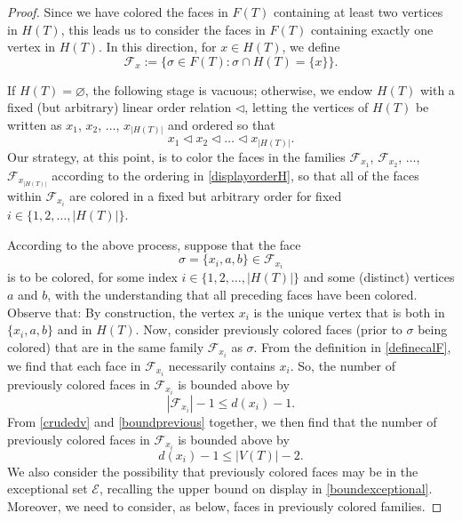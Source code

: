 \documentclass[12pt]{article}
\begin{document}
\begin{proof}
 Since we have colored the faces in $F(T)$ containing at least two vertices in $H(T)$, 
 this leads us to consider the faces in $F(T)$ containing exactly one vertex in $H(T)$.
 In this direction, for $x \in H(T)$, we define
\begin{equation}\label{definecalF}
 \mathcal{F}_{x} := \{ \sigma \in F(T) : \sigma \cap H(T) = \{ x \} \}. 
\end{equation}
 
 If $H(T) = \varnothing$, the following stage is vacuous; otherwise, we endow $H(T)$ with a fixed (but arbitrary) linear order relation 
 $\triangleleft$, letting the vertices of $H(T)$ be written as $x_{1}$, $x_{2}$, $\ldots$, $x_{|H(T)|}$
 and ordered so that 
\begin{equation}\label{displayorderH} 
 x_{1} \triangleleft x_{2} \triangleleft \ldots \triangleleft x_{|H(T)|}.
\end{equation}
 Our strategy, at this point, is to 
 color the faces in the families 
 $\mathcal{F}_{x_{1}}$, $\mathcal{F}_{x_{2}}$, $\ldots$, $\mathcal{F}_{x_{|H(T)|}}$
 according to the ordering in \eqref{displayorderH}, 
 so that all of the faces within $\mathcal{F}_{x_{i}}$ are colored in a fixed but arbitrary order
 for fixed $i \in \{ 1, 2, \ldots, |H(T)| \}$. 

 According to the above process, suppose that 
 the face 
\begin{equation}\label{definesigma} 
 \sigma = \{ x_{i}, a, b \} \in \mathcal{F}_{x_{i}}
\end{equation}
 is to be colored, for some index 
 $i \in \{ 1, 2, \ldots, |H(T)| \}$ 
 and some (distinct) vertices $a$ and $b$, with the understanding that all preceding faces have been colored.
 Observe that: By construction, the vertex $x_i$ is the unique vertex that is both in $\{ x_i, a, b \}$ and in $H(T)$. 
 Now, consider previously colored faces (prior to $\sigma$ being colored) 
  that are in the same family $\mathcal{F}_{x_{i}}$ as $\sigma$. 
 From the definition in \eqref{definecalF}, 
 we find that each face in $\mathcal{F}_{x_{i}}$ necessarily contains $x_{i}$. 
 So, the number of previously colored faces
 in $\mathcal{F}_{x_{i}}$
 is bounded above by 
\begin{equation}\label{boundprevious} 
 \left| \mathcal{F}_{x_{i}} \right| - 1 \leq d(x_i) - 1. 
\end{equation} 
 From \eqref{crudedv} and \eqref{boundprevious} together,  we then find that the number of previously colored faces in 
  $\mathcal{F}_{x_{i}}$ is bounded above by 
\begin{equation}\label{upperVTminus2}
 d(x_{i}) - 1 \leq \left| V(T) \right| - 2.
\end{equation}
 We also consider the possibility that previously colored faces may be in the exceptional set $\mathcal{E}$, recalling the upper bound on 
 display in \eqref{boundexceptional}. Moreover, we need to consider, as below, faces in previously colored families. 


\end{proof}
\end{document}
